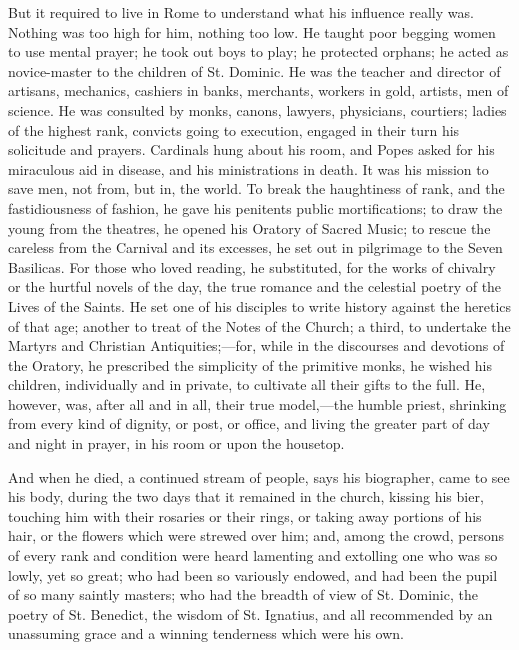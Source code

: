 But it required to live in Rome to understand what his
influence really was. Nothing was too high for him,
nothing too low. He taught poor begging women to use
mental prayer; he took out boys to play; he protected
orphans; he acted as novice-master to the children of St.
Dominic. He was the teacher and director of artisans,
mechanics, cashiers in banks, merchants, workers in gold,
artists, men of science. He was consulted by monks,
canons, lawyers, physicians, courtiers; ladies of the
highest rank, convicts going to execution, engaged in
their turn his solicitude and prayers. Cardinals hung
about his room, and Popes asked for his miraculous aid in
disease, and his ministrations in death. It was his
mission to save men, not from, but in, the world. To
break the haughtiness of rank, and the fastidiousness of
fashion, he gave his penitents public mortifications; to
draw the young from the theatres, he opened his Oratory
of Sacred Music; to rescue the careless from the Carnival
and its excesses, he set out in pilgrimage to the Seven
Basilicas. For those who loved reading, he substituted,
for the works of chivalry or the hurtful novels of the
day, the true romance and the celestial poetry of the Lives of the Saints. He set one of his disciples to write
history against the heretics of that age; another to
treat of the Notes of the Church; a third, to undertake
the Martyrs and Christian Antiquities;—for, while in
the discourses and devotions of the Oratory, he
prescribed the simplicity of the primitive monks, he
wished his children, individually and in private, to
cultivate all their gifts to the full. He, however, was,
after all and in all, their true model,—the humble
priest, shrinking from every kind of dignity, or post, or
office, and living the greater part of day and night in
prayer, in his room or upon the housetop.

And when he died, a continued stream of people, says
his biographer, came to see his body, during the two days
that it remained in the church, kissing his bier,
touching him with their rosaries or their rings, or
taking away portions of his hair, or the flowers which
were strewed over him; and, among the crowd, persons of
every rank and condition were heard lamenting and
extolling one who was so lowly, yet so great; who had
been so variously endowed, and had been the pupil of so
many saintly masters; who had the breadth of view of St.
Dominic, the poetry of St. Benedict, the wisdom of St.
Ignatius, and all recommended by an unassuming grace and
a winning tenderness which were his own.

